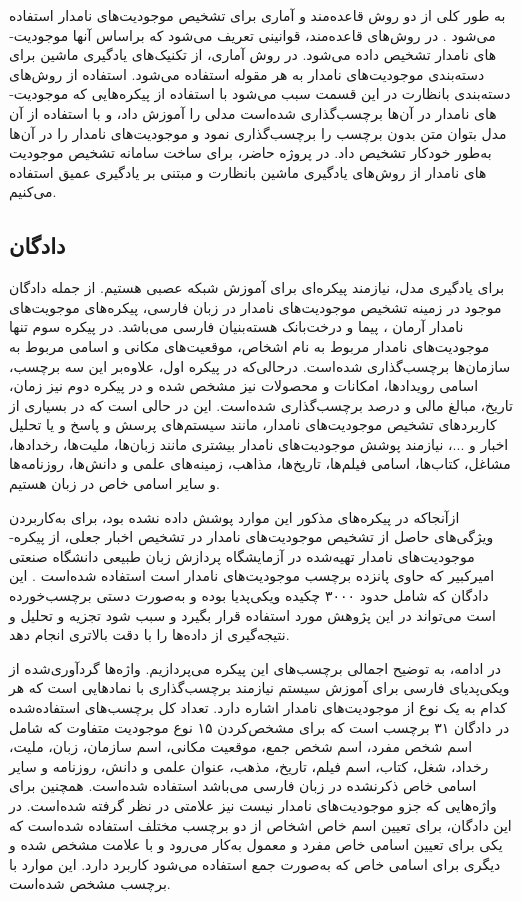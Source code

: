 به طور کلی از دو روش قاعده‌مند و آماری برای تشخیص موجودیت‌­های نامدار استفاده می‌­شود \citep{Jurafsky2009}. در روش‌­های قاعده‌مند، قوانینی تعریف می‌­شود که براساس آنها موجودیت‌­های نامدار تشخیص داده می‌­شود. در روش آماری، از تکنیک­‌های یادگیری ماشین برای دسته­‌بندی موجودیت­‌های نامدار به هر مقوله استفاده می‌­شود. استفاده از روش­‌های دسته‌بندی بانظارت در این قسمت سبب می‌­شود  با استفاده از پیکره‌هایی که موجودیت‌­های نامدار  در آن‌ها برچسب‌گذاری شده‌است  مدلی را آموزش داد، و با استفاده از آن مدل بتوان متن بدون برچسب را برچسب‌گذاری نمود و موجودیت‌های نامدار را در آن‌ها به‌طور خودکار تشخیص داد. در پروژه حاضر، برای ساخت سامانه تشخیص موجودیت­‌های نامدار از روش­‌های یادگیری ماشین بانظارت و مبتنی ‌بر یادگیری عمیق استفاده می‌کنیم.

\subsection{دادگان}
برای یادگیری مدل، نیازمند پیکره‌­ای برای آموزش شبکه عصبی هستیم. از جمله دادگان موجود در زمینه تشخیص موجودیت­‌های نامدار در زبان فارسی، پیکره‌های موجویت‌­های نامدار آرمان \citep{poostchi2016personer}، پیما \citep{shahshahani2019peyma} و درخت‌بانک هسته‌بنیان فارسی \citep{ghayoomi2012} می‌­باشد. در پیکره سوم  تنها موجودیت‌­های نامدار مربوط به نام اشخاص، موقعیت­‌های مکانی و اسامی مربوط به سازمان‌­ها برچسب‌گذاری شده‌است. درحالی‌که در پیکره اول، علاوه‌بر این سه برچسب، اسامی رویدادها، امکانات و محصولات نیز مشخص شده و در پیکره دوم نیز زمان، تاریخ، مبالغ مالی و درصد برچسب‌گذاری شده‌است.  این در حالی است که در بسیاری از کاربردهای تشخیص موجودیت‌­های نامدار، مانند سیستم‌­های پرسش و پاسخ و یا تحلیل اخبار و ...، نیازمند پوشش موجودیت­‌های نامدار بیشتری مانند زبان‌­ها، ملیت‌­ها، رخدادها، مشاغل، کتاب‌­ها، اسامی فیلم‌­ها، تاریخ­‌ها، مذاهب، زمینه‌های علمی و دانش‌­ها، روزنامه‌­ها و سایر اسامی خاص در زبان هستیم.

ازآنجاکه در پیکره­‌های مذکور این موارد پوشش داده نشده بود، برای به‌کاربردن ویژگی‌های حاصل از تشخیص موجودیت­‌های نامدار در تشخیص اخبار جعلی، از پیکره‌­ موجودیت‌های نامدار تهیه‌شده در آزمایشگاه پردازش زبان طبیعی دانشگاه صنعتی امیرکبیر که حاوی پانزده برچسب موجودیت‌­های نامدار است استفاده شده‌است \citep{momtazi2020named}. این دادگان که شامل حدود ۳۰۰۰ چکیده ویکی‌پدیا بوده و به‌صورت دستی برچسب‌خورده است می‌­تواند در این پژوهش مورد استفاده قرار بگیرد و سبب شود تجزیه­ و­ تحلیل و نتیجه‌گیری از داده‌ها را با دقت بالاتری انجام دهد. 

در ادامه، به توضیح اجمالی برچسب‌های این پیکره می‌پردازیم. واژه‌ها گردآوری‌شده از ویکی‌پدیای فارسی برای آموزش سیستم نیازمند برچسب‌گذاری با نمادهایی است که هر کدام به یک نوع از موجودیت‌­های نامدار اشاره دارد. تعداد کل برچسب­‌های استفاده‌شده در دادگان ۳۱ برچسب است که برای مشخص‌کردن ۱۵ نوع موجودیت متفاوت که شامل اسم شخص مفرد، اسم شخص جمع، موقعیت مکانی، اسم سازمان، زبان، ملیت، رخداد، شغل، کتاب، اسم فیلم، تاریخ، مذهب، عنوان علمی و دانش، روزنامه و سایر اسامی خاص ذکرنشده در زبان فارسی می‌باشد استفاده شده‌است. همچنین برای واژه‌هایی که جزو موجودیت­‌های نامدار نیست نیز علامتی در نظر گرفته شده‌است. در این دادگان، برای تعیین اسم خاص اشخاص از دو برچسب مختلف استفاده شده‌است که یکی برای تعیین اسامی خاص مفرد و معمول به‌کار می‌­رود و با علامت  مشخص شده و دیگری برای اسامی خاص که به‌صورت جمع استفاده می‌شود کاربرد دارد. این موارد با برچسب  مشخص شده‌است.

